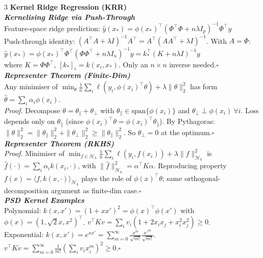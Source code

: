 \documentclass[a4paper,7pt]{article}
\begin{document}
\begin{multicols*}{3}
\textbf{Kernel Ridge Regression (KRR)}\\

\textit{\textbf{Kernelising Ridge via Push-Through}}\\
Feature-space ridge prediction: $\hat y(x_*)=\phi(x_*)^\top(\Phi^\top\Phi+n\lambda I_p)^{-1}\Phi^\top y$\\
Push-through identity: $(A^\top A+\lambda I)^{-1}A^\top=A^\top(AA^\top+\lambda I)^{-1}$. With $A=\Phi$:\\
$\hat y(x_*)=\phi(x_*)^\top\Phi^\top(\Phi\Phi^\top+n\lambda I_n)^{-1}y=k_*^\top(K+n\lambda I)^{-1}y$\\
where $K=\Phi\Phi^\top$, $[k_*]_i=k(x_i,x_*)$. Only an $n\times n$ inverse needed.\hfill$\square$\\

\textit{\textbf{Representer Theorem (Finite-Dim)}}\\
Any minimiser of $\min_\theta\frac{1}{n}\sum_i\ell(y_i,\phi(x_i)^\top\theta)+\lambda\|\theta\|_2^2$ has form $\hat\theta=\sum_i\alpha_i\phi(x_i)$.\\
\textit{Proof.} Decompose $\theta=\theta_\|+\theta_\perp$ with $\theta_\|\in\mathrm{span}\{\phi(x_i)\}$ and $\theta_\perp\perp\phi(x_i)\ \forall i$. Loss depends only on $\theta_\|$ (since $\phi(x_i)^\top\theta=\phi(x_i)^\top\theta_\|$). By Pythagoras: $\|\theta\|_2^2=\|\theta_\|\|_2^2+\|\theta_\perp\|_2^2\geq\|\theta_\|\|_2^2$. So $\theta_\perp=0$ at the optimum.\hfill$\square$\\

\textit{\textbf{Representer Theorem (RKHS)}}\\
\textit{Proof.} Minimiser of $\min_{f\in\mathcal{H}_k}\frac{1}{n}\sum_i\ell(y_i,f(x_i))+\lambda\|f\|_{\mathcal{H}_k}^2$ is \\$\hat f(\cdot)=\sum_i\alpha_i k(x_i,\cdot)$, with $\|\hat f\|_{\mathcal{H}_k}^2=\alpha^\top K\alpha$.
Reproducing property $f(x)=\langle f,k(x,\cdot)\rangle_{\mathcal{H}_k}$ plays the role of $\phi(x)^\top\theta$; same orthogonal-decomposition argument as finite-dim case.\hfill$\square$\\

\textit{\textbf{PSD Kernel Examples}}\\
Polynomial: $k(x,x')=(1+xx')^2=\phi(x)^\top\phi(x')$ with $\phi(x)=(1,\sqrt{2}x,x^2)^\top$. $v^\top Kv=\sum_i v_i(1+2x_ix_j+x_i^2x_j^2)\geq 0$.\\
Exponential: $k(x,x')=e^{xx'}=\sum_{m=0}^\infty\frac{x^m}{\sqrt{m!}}\frac{x'^m}{\sqrt{m!}}$. $v^\top Kv=\sum_{m=0}^\infty\frac{1}{m!}(\sum_i v_i x_i^m)^2\geq 0$.\hfill$\square$\\


\end{multicols*}
\end{document}
